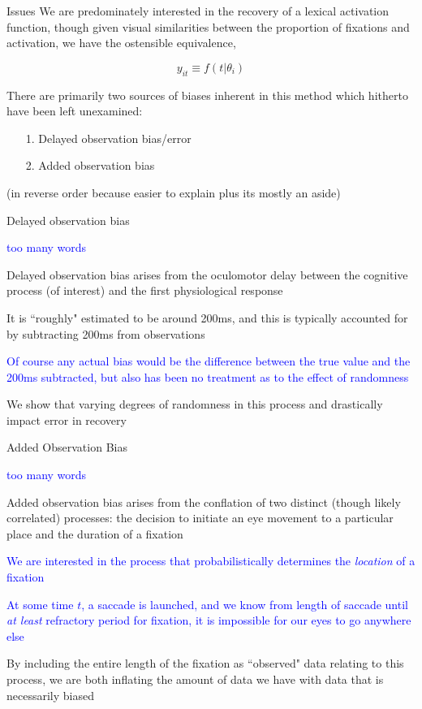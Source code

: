\documentclass{beamer}
\newcommand{\vp}{\vspace{2mm}}
\providecommand{\cn}[1]{\textcolor{blue}{#1}}
\begin{document}
\begin{frame}{Issues}
We are predominately interested in the recovery of a lexical activation function, though given visual similarities between the proportion of fixations and activation, we have the ostensible equivalence, 

\begin{equation}
y_{it} \equiv f(t | \theta_i)
\end{equation}

There are primarily two sources of biases inherent in this method which hitherto have been left unexamined:

\begin{itemize}
\item[1.] Delayed observation bias/error
\item[2.] Added observation bias
\end{itemize}

(in reverse order because easier to explain plus its mostly an aside)
\end{frame}


\begin{frame}{Delayed observation bias}

\cn{too many words} \vp

Delayed observation bias arises from the oculomotor delay between the cognitive process (of interest) and the first physiological response \vp

It is ``roughly" estimated to be around 200ms, and this is typically accounted for by subtracting 200ms from observations \vp

\cn{Of course any actual bias would be the difference between the true value and the 200ms subtracted, but also has been no treatment as to the effect of randomness} \vp

We show that varying degrees of randomness in this process and drastically impact error in recovery
\end{frame}

\begin{frame}{Added Observation Bias}

\cn{too many words} \vp

Added observation bias arises from the conflation of two distinct (though likely correlated) processes: the decision to initiate an eye movement to a particular place and the duration of a fixation\vp

\cn{We are interested in the process that probabilistically determines the \textit{location} of a fixation} \vp

\cn{At some time $t$, a saccade is launched, and we know from length of saccade until \textit{at least} refractory period for fixation, it is impossible for our eyes to go anywhere else} \vp

By including the entire length of the fixation as ``observed" data relating to this process, we are both inflating the amount of data we have with data that is necessarily biased
\end{frame}
\end{document}
